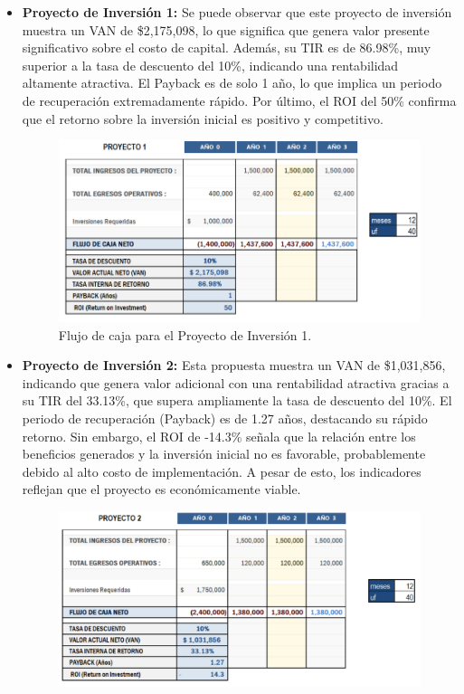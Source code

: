 \begin{itemize}
	\begin{itemize}
		\item \textbf{Proyecto de Inversión 1:} Se puede observar que este proyecto de inversión muestra un VAN de \$2,175,098, lo que significa que genera valor presente significativo sobre el costo de capital. Además, su TIR es de 86.98\%, muy superior a la tasa de descuento del 10\%, indicando una rentabilidad altamente atractiva. El Payback es de solo 1 año, lo que implica un periodo de recuperación extremadamente rápido. Por último, el ROI del 50\% confirma que el retorno sobre la inversión inicial es positivo y competitivo.
	\begin{figure}
		\centering
		\includegraphics[width=0.9\linewidth]{img/ejemplos/Figure_13}
		\caption{Flujo de caja para el Proyecto de Inversión 1.}
		\label{fig:optisystem}
	\end{figure}
	\item \textbf{Proyecto de Inversión 2:} Esta propuesta muestra un VAN de \$1,031,856, indicando que genera valor adicional con una rentabilidad atractiva gracias a su TIR del 33.13\%, que supera ampliamente la tasa de descuento del 10\%. El periodo de recuperación (Payback) es de 1.27 años, destacando su rápido retorno. Sin embargo, el ROI de -14.3\% señala que la relación entre los beneficios generados y la inversión inicial no es favorable, probablemente debido al alto costo de implementación. A pesar de esto, los indicadores reflejan que el proyecto es económicamente viable.
	\begin{figure}
		\centering
		\includegraphics[width=0.9\linewidth]{img/ejemplos/Figure_14}

\end{figure}
\end{itemize}
\end{itemize}
